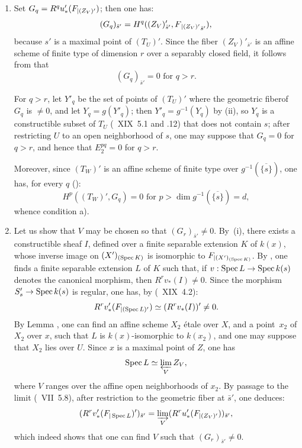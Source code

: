 \begin{enumerate}
\item[$1^\circ)$]
Set $G_q = R^q u'_*(F\sisi{}{_{|(Z_V)'}})$; then one has:
$$(G_q)_{\bar{s}'}=H^q((Z_V)'_{\bar{s}'}, F\sisi{}{{_{|(Z_V)'}}}_{\bar{s}'}),
$$
because $s'$ is a maximal point of $(T_U)'$. Since the fiber $(Z_V)'_{\bar{s}'}$ is an affine scheme of finite type of dimension $r$ over a separably closed field, it follows from  that
$$(G_q)_{\bar{s}'}=0 \text{ for } q>r.
$$

For $q>r$, let $Y'_q$ be the set of points of $(T_U)'$ where the geometric fiber\pageoriginale of $G_q$ is $\neq 0$, and let $Y_q=g(Y'_q)$; then $Y'_q = g^{-1}(Y_q)$ by \textup{(ii)}, so $Y_q$ is a constructible subset of $T_U$ (~XIX~5.1 and .12) that does not contain $s$; after restricting $U$ to an open neighborhood of $s$, one may suppose that $G_q=0$ for $q>r$, and hence that $E_2^{pq}=0$ for $q>r$.

Moreover, since $(T_W)'$ is an affine scheme of finite type over $g^{-1}(\overline{\{s\}})$, one has, for every $q$ (\cf {}):
$$H^p((T_W)', G_q)=0 \text{ for } p>\dim g^{-1}(\overline{\{s\}})=d,
$$
whence condition a).

\item[$2^\circ)$]
Let us show that $V$ may be chosen so that $(G_r)_{\bar{s}'} \neq 0$. By~\textup{(i)}, there exists a constructible sheaf $I$, defined over a finite separable extension $K$ of $k(x)$, whose inverse image on $(X')_{(\Spec K)}$ is isomorphic to $\sisi{F{|(X')_{(\Spec K)}}}{F_{|(X')_{(\Spec K)}}}$. By , one finds a finite separable extension $L$ of $K$ such that, if $v:\Spec L \to \Spec k(s)$ denotes the canonical morphism, then $R^r v_*(I) \neq 0$. Since the morphism $S'_s \to \Spec k(s)$ is regular, one has, by (~XIX~4.2):
$$R^rv_*'(\sisi{F{|(\Spec L)'}}{F_{|(\Spec L)'}}) \simeq (R^rv_*(I))' \neq 0.
$$
By Lemma , one can find an affine scheme $X_2$ \'{e}tale over $X$, and a point~$x_2$ of $X_2$ over $x$, such that $L$ is $k(x)$-isomorphic to $k(x_2)$, and one may suppose that $X_2$ lies over $U$. Since $x$ is a maximal point of $Z$, one has\pageoriginale
$$
\Spec L \simeq \varprojlim_V Z_V,
$$
where $V$ ranges over the affine open neighborhoods of $x_2$. By passage to the limit (~VII~5.8), after restriction to the geometric fiber at $\bar{s}'$, one deduces:
$$
(R^rv_*'(\sisi{F{|\Spec L}}{F_{|\Spec L}})')_{\bar{s}'} = \varinjlim_V (R^ru_*'(F\sisi{}{_{|(Z_V)'}})\sisi{}{)}_{\bar{s}'},
$$
which indeed shows that one can find $V$ such that $(G_r)_{\bar{s}'} \neq 0$.


\end{enumerate}
